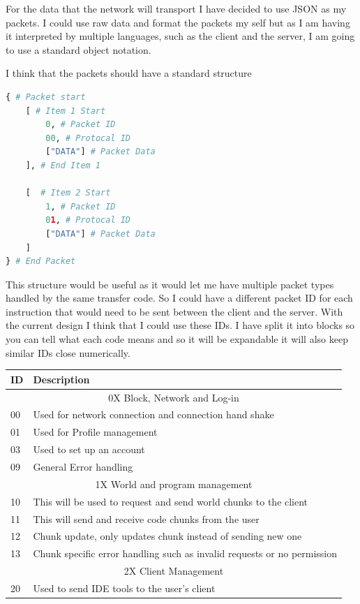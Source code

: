 \documentclass[12pt]{article}
\begin{document}
For the data that the network will transport I have decided to use JSON as my packets. I could use raw data and format the packets my self but as I am having it interpreted by multiple languages, such as the client and the server, I am going to use a standard object notation.

I think that the packets should have a standard structure

\begin{lstlisting}[language=Python, caption=JSON Packet example]
{ # Packet start
    [ # Item 1 Start
        0, # Packet ID
        00, # Protocal ID
        ["DATA"] # Packet Data
    ], # End Item 1
    
    [  # Item 2 Start
        1, # Packet ID
        01, # Protocal ID
        ["DATA"] # Packet Data
    ]
} # End Packet
\end{lstlisting}

This structure would be useful as it would let me have multiple packet types handled by the same transfer code. So I could have a different packet ID for each instruction that would need to be sent between the client and the server. With the current design I think that I could use these IDs. I have split it into blocks so you can tell what each code means and so it will be expandable it will also keep similar IDs close numerically.

\begin{tabular}{ l | l }
  \hline			
  ID & Description \\
  \hline
  \multicolumn{2}{c}{0X Block, Network and Log-in} \\
  \hline
  00 & Used for network connection and connection hand shake\\
  01 & Used for Profile management\\
  03 & Used to set up an account\\
  09 & General Error handling\\
  \hline
  \multicolumn{2}{c}{1X World and program management} \\
  \hline
  10 & This will be used to request and send world chunks to the client\\
  11 & This will send and receive code chunks from the user\\
  12 & Chunk update, only updates chunk instead of sending new one\\
  13 & Chunk specific error handling such as invalid requests or no permission\\
  \hline
  \multicolumn{2}{c}{2X Client Management} \\
  \hline
  20 & Used to send IDE tools to the user's client\\
  \hline  
\end{tabular}
\end{document}
